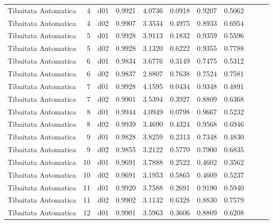 \begin{landscape}
\begin{longtable}{p{2cm}rrrrrrrrrr}
 Tibaitata Automatica  &          4 &     d01 &   0.9921 &  4.0736 &        0.0918 &           0.9207 &  0.5062 \\
 Tibaitata Automatica  &          4 &     d02 &   0.9907 &  3.3534 &        0.4975 &           0.8933 &  0.6954 \\
 Tibaitata Automatica  &          5 &     d01 &   0.9928 &  3.9113 &        0.1832 &           0.9359 &  0.5596 \\
 Tibaitata Automatica  &          5 &     d02 &   0.9928 &  3.1320 &        0.6222 &           0.9355 &  0.7788 \\
 Tibaitata Automatica  &          6 &     d01 &   0.9834 &  3.6776 &        0.3149 &           0.7475 &  0.5312 \\
 Tibaitata Automatica  &          6 &     d02 &   0.9837 &  2.8807 &        0.7638 &           0.7524 &  0.7581 \\
 Tibaitata Automatica  &          7 &     d01 &   0.9928 &  4.1595 &        0.0434 &           0.9348 &  0.4891 \\
 Tibaitata Automatica  &          7 &     d02 &   0.9901 &  3.5394 &        0.3927 &           0.8809 &  0.6368 \\
 Tibaitata Automatica  &          8 &     d01 &   0.9944 &  4.0949 &        0.0798 &           0.9667 &  0.5232 \\
 Tibaitata Automatica  &          8 &     d02 &   0.9939 &  3.4690 &        0.4324 &           0.9568 &  0.6946 \\
 Tibaitata Automatica  &          9 &     d01 &   0.9828 &  3.8259 &        0.2313 &           0.7348 &  0.4830 \\
 Tibaitata Automatica  &          9 &     d02 &   0.9855 &  3.2122 &        0.5770 &           0.7900 &  0.6835 \\
 Tibaitata Automatica  &         10 &     d01 &   0.9691 &  3.7888 &        0.2522 &           0.4602 &  0.3562 \\
 Tibaitata Automatica  &         10 &     d02 &   0.9691 &  3.1953 &        0.5865 &           0.4609 &  0.5237 \\
 Tibaitata Automatica  &         11 &     d01 &   0.9920 &  3.7588 &        0.2691 &           0.9190 &  0.5940 \\
 Tibaitata Automatica  &         11 &     d02 &   0.9902 &  3.1132 &        0.6328 &           0.8830 &  0.7579 \\
 Tibaitata Automatica  &         12 &     d01 &   0.9901 &  3.5963 &        0.3606 &           0.8809 &  0.6208 \\

\end{longtable}
\end{landscape}
